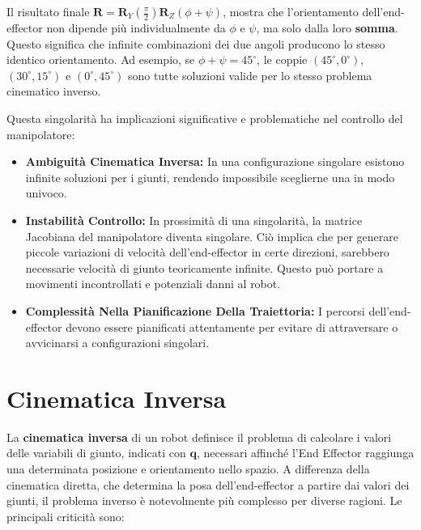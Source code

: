 ﻿\documentclass[11pt, a4paper]{article}
\begin{document}
Il risultato finale \(\mathbf{R} = \mathbf{R}_{Y}(\frac{\pi}{2}) \mathbf{R}_{Z}(\phi + \psi)\), mostra che l'orientamento dell'end-effector non dipende più individualmente da \(\phi\) e \(\psi\), ma solo dalla loro \textbf{somma}. Questo significa che infinite combinazioni dei due angoli producono lo stesso identico orientamento. Ad esempio, se \(\phi + \psi = 45^\circ\), le coppie \((45^\circ, 0^\circ)\), \((30^\circ, 15^\circ)\) e \((0^\circ, 45^\circ)\) sono tutte soluzioni valide per lo stesso problema cinematico inverso.

Questa singolarità ha implicazioni significative e problematiche nel controllo del manipolatore:
\begin{itemize}
    \item \textbf{Ambiguità Cinematica Inversa:} In una configurazione singolare esistono infinite soluzioni per i giunti, rendendo impossibile sceglierne una in modo univoco.

    \item \textbf{Instabilità Controllo:} In prossimità di una singolarità, la matrice Jacobiana del manipolatore diventa singolare. Ciò implica che per generare piccole variazioni di velocità dell'end-effector in certe direzioni, sarebbero necessarie velocità di giunto teoricamente infinite. Questo può portare a movimenti incontrollati e potenziali danni al robot.

    \item \textbf{Complessità Nella Pianificazione Della Traiettoria:} I percorsi dell'end-effector devono essere pianificati attentamente per evitare di attraversare o avvicinarsi a configurazioni singolari.
\end{itemize}

\newpage
\section{Cinematica Inversa}
La \textbf{cinematica inversa} di un robot definisce il problema di calcolare i valori delle variabili di giunto, indicati con \( \mathbf{q} \), necessari affinché l'End Effector raggiunga una determinata posizione e orientamento nello spazio. A differenza della cinematica diretta, che determina la posa dell'end-effector a partire dai valori dei giunti, il problema inverso è notevolmente più complesso per diverse ragioni. Le principali criticità sono:
\end{document}
